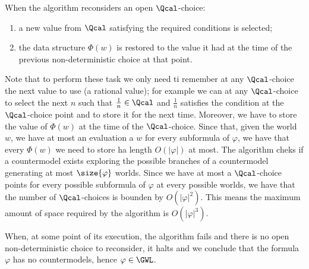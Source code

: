 When the algorithm reconsiders an open $\Qcal$-choice:
\begin{enumerate}
\item a new value from $\Qcal$ satisfying the required conditions is
  selected;
\item the data structure $\Phi(w)$ is restored to the value it had at
  the time of the previous non-deterministic choice at that point.
\end{enumerate}
Note that to perform these task we only need ti remember at any
$\Qcal$-choice the next value to use (a rational value); for example
we can at any $\Qcal$-choice to select the next $n$ such that
$\frac{1}{n}\in\Qcal$ and $\frac{1}{n}$ satisfies the condition at the
$\Qcal$-choice point and to store it for the next time. Moreover, we
have to store the value of $\Phi(w)$ at the time of the
$\Qcal$-choice. Since that, given the world $w$, we have at most an
evaluation a $w$ for every subformula of $\varphi$, we have that every
$\Phi(w)$ we need to store ha length $O(|\varphi|)$ at most. The
algorithm cheks if a countermodel exists exploring the possible branches
of a countermodel generating at most $\size{\varphi}$ worlds. Since we
have at most a $\Qcal$-choice points for every possible subformula of
$\varphi$ at every possible worlds, we have that the number of
$\Qcal$-choices is bounden by $O(|\varphi|^2)$.  This means the maximum
amount of space required by the algorithm is $O(|\varphi|^3)$.


When, at some point of its execution, the algorithm fails and there is
no open non-deterministic choice to reconsider, it halts and we
conclude that the formula $\varphi$ has no countermodels, hence
$\varphi\in\GWL$. 



